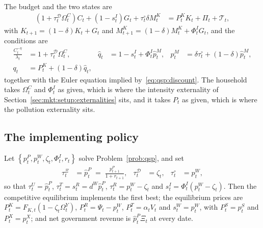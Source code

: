  The budget and the two states are
\begin{align}
\left(1+\tau^{\mathcal D}_t\Omega^C_t\right)C_t+\left(1-s^I_t\right)G_t+\tau^{\circ}_t\delta M^K_t
&= P^K_tK_t+\Pi_t+\mathcal T_t,
\label{eq:qmkt:hh-budget}
\end{align}
with $K_{t+1}=\left(1-\delta\right)K_t+G_t$ and $M^K_{t+1}=\left(1-\delta\right)M^K_t+\Phi^I_tG_t$, and
the conditions are
\begin{align}
\frac{C_t^{-\eta}}{\lambda_t} &= 1+\tau^{\mathcal D}_t\Omega^C_t,
&
\hat q_t &= 1-s^I_t+\Phi^I_t\hat p^M_t,
&
p^M_t &= \delta\tau^{\circ}_t+\left(1-\delta\right)\hat p^M_t,
\label{eq:qmkt:hh-foc}
\\
q_t &= P^K_t+\left(1-\delta\right)\hat q_t,
\label{eq:qmkt:hh-arbitrage}
\end{align}
together with the Euler equation implied by~\eqref{eq:qsp:discount}. The household takes $\Omega^C_t$
and $\Phi^I_t$ as given, which is where the intensity externality of
Section~\ref{sec:mkt:setup:externalities} sits, and it takes $P_t$ as given, which is where the
pollution externality sits.

\subsection{The implementing policy}\label{sec:qmkt:model:policy}

\begin{proposition}\label{prop:qmkt:implementation}
Let $\left\{p^P_t,p^W_t,\zeta_t,\Phi^I_t,r_t\right\}$ solve Problem~\ref{prob:qsp}, and set
\begin{align}
\tau^{\Xi}_t &= \hat p^P_t\;=\;\frac{p^P_{t+1}}{1+r_{t+1}},
&
\tau^{\mathcal D}_t &= \zeta_t,
&
\tau^{\circ}_t &= p^W_t,
\label{eq:qmkt:implement-primitives}
\end{align}
so that $\tau^U_t=\hat p^P_t$, $\tau^T_t=s^R_t=d^W\hat p^P_t$, $\tau^R_t=p^W_t-\zeta_t$ and
$s^I_t=\Phi^I_t\left(p^W_t-\zeta_t\right)$. Then the competitive equilibrium implements the first best;
the equilibrium prices are $P^K_t=F_{K,t}\left(1-\zeta_t\Omega^Y_t\right)$, $P^R_t=\Psi_t-p^W_t$,
$P^T_t=\alpha_tV_t$ and $s^W_t=p^W_t$, with $P^S_t=p^S_t$ and $P^X_t=p^X_t$; and net government revenue
is $\hat p^P_t\Xi_t$ at every date.
\end{proposition}

